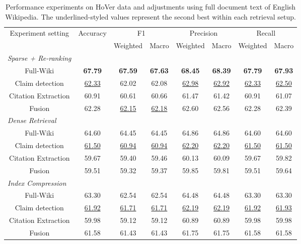 \begin{table}[htb!]
\small
\begin{tabular}{c c c c c c c c}
\multirow{2}{*}{Experiment setting} & \multirow{2}{*}{Accuracy} & \multicolumn{2}{c}{F1} & \multicolumn{2}{c}{Precision} & \multicolumn{2}{c}{Recall}  \\ 
\cline{3-8}
  & &  Weighted  & Macro & Weighted & Macro & Weighted & Macro      \\
\hline
\multicolumn{1}{l}{\textit{Sparse + Re-ranking}} & & & & \\
Full-Wiki & \textbf{67.79} & \textbf{67.59} & \textbf{67.63} & \textbf{68.45} & \textbf{68.39} & \textbf{67.79}  & \textbf{67.93}\\
Claim detection & \underline{62.33} & 62.02 & 62.08 & \underline{62.98} & \underline{62.92} & \underline{62.33} & \underline{62.50} \\
Citation Extraction & 60.91 & 60.61 & 60.66 & 61.47 & 61.42 & 60.91 & 61.07 \\
Fusion & 62.28 & \underline{62.15} & \underline{62.18} & 62.60 & 62.56 & 62.28 & 62.39  \\[5mm]

\hline
\multicolumn{1}{l}{\textit{Dense Retrieval}} & & & & \\
Full-Wiki & 64.60 & 64.45 & 64.45 & 64.86 & 64.86 & 64.60 & 64.60 \\
Claim detection & \underline{61.50} & \underline{60.94} & \underline{60.94} & \underline{62.20} & \underline{62.20} & \underline{61.50} & \underline{61.50} \\
Citation Extraction & 59.67 & 59.40 & 59.46 & 60.13 & 60.09 & 59.67 & 59.82 \\
Fusion & 59.51 & 59.32 & 59.37 & 59.85 & 59.81 & 59.51 & 59.64  \\[5mm]

\hline
\multicolumn{1}{l}{\textit{Index Compression}} & & & & & & &  \\
Full-Wiki & 63.30 & 62.54 & 62.54 & 64.48 & 64.48 & 63.30 & 63.30 \\
Claim detection & \underline{61.92} & \underline{61.71} & \underline{61.71} & \underline{62.19} & \underline{62.19} & \underline{61.92} & \underline{61.93}  \\
Citation Extraction & 59.98 & 59.12 & 59.12 & 60.89 & 60.89 & 59.98 & 59.98   \\
Fusion & 61.58 & 61.43 & 61.43 & 61.75 & 61.75 & 61.58 & 61.58   \\[5mm]

\hline
\end{tabular}
\caption{Performance experiments on HoVer data and adjustments using full document text of English Wikipedia. The underlined-styled values represent the second best  within each retrieval setup.}
\label{tab:hover_performance_metrics}
\end{table}
% 